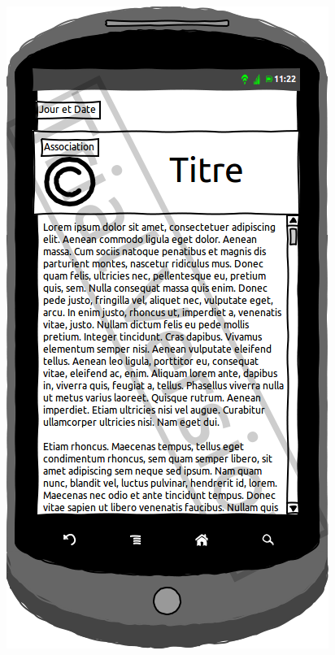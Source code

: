 \documentclass[a4paper, 11px]{article}
\begin{document}
\begin{figure}[htbp]
\begin{minipage}[c]{.50\linewidth}
\begin{center}
			\includegraphics[scale=0.3]{../../Sketch/Android/DescrNews.png}
		\end{center}
	\end{minipage}
\end{figure}
\end{document}
